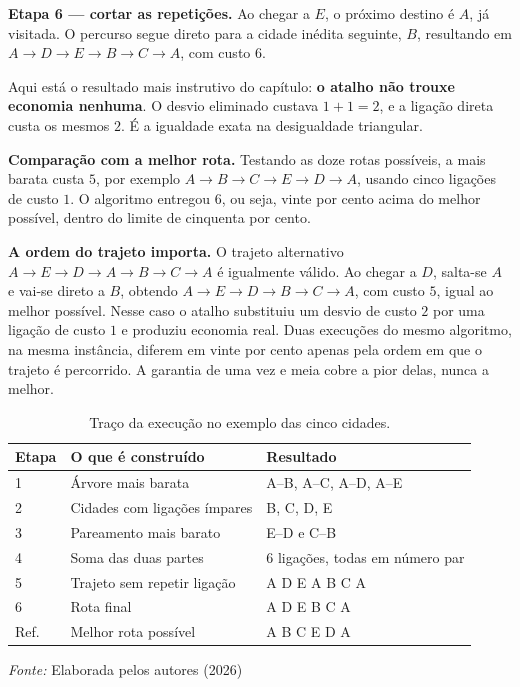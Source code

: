 \textbf{Etapa 6 --- cortar as repetições.} Ao chegar a $E$, o próximo destino é
$A$, já visitada. O percurso segue direto para a cidade inédita seguinte, $B$,
resultando em $A \to D \to E \to B \to C \to A$, com custo $6$.

Aqui está o resultado mais instrutivo do capítulo: \textbf{o atalho não trouxe
economia nenhuma}. O desvio eliminado custava $1+1=2$, e a ligação direta custa
os mesmos $2$. É a igualdade exata na desigualdade triangular.

\textbf{Comparação com a melhor rota.} Testando as doze rotas possíveis, a mais
barata custa $5$, por exemplo $A \to B \to C \to E \to D \to A$, usando cinco
ligações de custo $1$. O algoritmo entregou $6$, ou seja, vinte por cento acima
do melhor possível, dentro do limite de cinquenta por cento.

\textbf{A ordem do trajeto importa.} O trajeto alternativo
$A \to E \to D \to A \to B \to C \to A$ é igualmente válido. Ao chegar a $D$,
salta-se $A$ e vai-se direto a $B$, obtendo $A \to E \to D \to B \to C \to A$,
com custo $5$, igual ao melhor possível. Nesse caso o atalho substituiu um desvio
de custo $2$ por uma ligação de custo $1$ e produziu economia real. Duas
execuções do mesmo algoritmo, na mesma instância, diferem em vinte por cento
apenas pela ordem em que o trajeto é percorrido. A garantia de uma vez e meia
cobre a pior delas, nunca a melhor.

\begin{table}[!ht]
	\centering
	\caption{Traço da execução no exemplo das cinco cidades.}
	\label{tab:traco-quadrado}
	\begin{tabular}{p{1.4cm}p{5.6cm}p{4.6cm}}
	\hline
	\textbf{Etapa} & \textbf{O que é construído} & \textbf{Resultado} \\
	\hline
	1 & Árvore mais barata & A--B, A--C, A--D, A--E \\
	2 & Cidades com ligações ímpares & B, C, D, E \\
	3 & Pareamento mais barato & E--D e C--B \\
	4 & Soma das duas partes & 6 ligações, todas em número par \\
	5 & Trajeto sem repetir ligação & A D E A B C A \\
	6 & Rota final & A D E B C A \\
	\hline
	Ref. & Melhor rota possível & A B C E D A \\
	\hline
\end{tabular}

\vspace{0.15cm}
\parbox{12.8cm}{\footnotesize\textit{Fonte:} Elaborada pelos autores (2026)}
\end{table}

